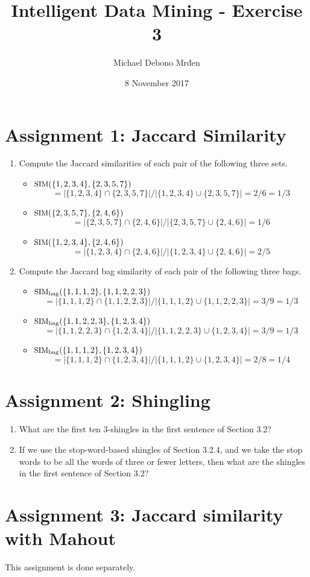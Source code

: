 \documentclass{article}
\title{Intelligent Data Mining - Exercise 3}
\author{\fontencoding{T1}\selectfont Michael Debono Mrđen}
\date{8 November 2017}
\begin{document}
\maketitle

\section{Assignment 1: Jaccard Similarity}
\renewcommand{\labelenumi}{\alph{enumi}.}
\renewcommand{\labelenumii}{(\alph{enumii})}

\begin{enumerate}
\item{Compute the Jaccard similarities of each pair of the following three sets.
	\begin{itemize}
		\item{$\text{\small SIM} (\{1,2,3,4\}, \{2,3,5,7\})$
		    \[ = |\{1,2,3,4\} \cap \{2,3,5,7\}| / |\{1,2,3,4\} \cup \{2,3,5,7\}| = 2/6 = 1/3 \]}
		\item{$\text{\small SIM} (\{2,3,5,7\}, \{2,4,6\})$
			\[ = |\{2,3,5,7\} \cap \{2,4,6\}| / |\{2,3,5,7\} \cup \{2,4,6\}| = 1/6 \]}
		\item{$\text{\small SIM}(\{1,2,3,4\}, \{2,4,6\})$
			\[ = |\{1,2,3,4\} \cap \{2,4,6\}| / |\{1,2,3,4\} \cup \{2,4,6\}| = 2/5 \]}
	\end{itemize}
}
\item{Compute the Jaccard bag similarity of each pair of the following three bags.
	\begin{itemize}
		\item{$\text{\small SIM}_{\text{bag}} (\{1,1,1,2\}, \{1,1,2,2,3\})$
			\[ = |\{1,1,1,2\} \cap \{1,1,2,2,3\}| / |\{1,1,1,2\} \cup \{1,1,2,2,3\}| = 3/9 = 1/3 \]}
		\item{$\text{\small SIM}_{\text{bag}} (\{1,1,2,2,3\}, \{1,2,3,4\})$
			\[ = |\{1,1,2,2,3\} \cap \{1,2,3,4\}| / |\{1,1,2,2,3\} \cup \{1,2,3,4\}| = 3/9 = 1/3 \]}
		\item{$\text{\small SIM}_{\text{bag}} (\{1,1,1,2\}, \{1,2,3,4\})$
			\[ = |\{1,1,1,2\} \cap \{1,2,3,4\}| / |\{1,1,1,2\} \cup \{1,2,3,4\}| = 2/8 = 1/4 \]}
	\end{itemize}
}
\end{enumerate}

\section{Assignment 2: Shingling}
\begin{enumerate}
\item{What are the first ten 3-shingles in the first sentence of Section 3.2?}
\item{If we use the stop-word-based shingles of Section 3.2.4, and we take the stop words to be all the words of three or fewer letters, then what are the shingles in the first sentence of Section 3.2?}
\end{enumerate}

\section{Assignment 3: Jaccard similarity with Mahout}
This assignment is done separately.
\end{document}
